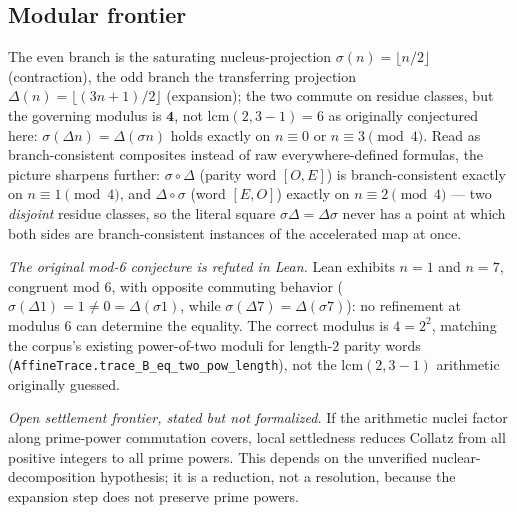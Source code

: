 \subsection{Modular frontier}

\begin{theorem}
  \label{thm:collatz-mod6-commute}
  \leanok
  The even branch is the saturating nucleus-projection $\sigma(n)=\lfloor n/2\rfloor$
  (contraction), the odd branch the transferring projection
  $\Delta(n)=\lfloor(3n+1)/2\rfloor$ (expansion); the two commute on residue classes,
  but the governing modulus is $\mathbf{4}$, not $\mathrm{lcm}(2,3-1)=6$ as originally
  conjectured here: $\sigma(\Delta n)=\Delta(\sigma n)$ holds exactly on
  $n\equiv 0$ or $n\equiv 3\pmod 4$. Read as branch-consistent composites instead of
  raw everywhere-defined formulas, the picture sharpens further: $\sigma\circ\Delta$
  (parity word $[O,E]$) is branch-consistent exactly on $n\equiv1\pmod4$, and
  $\Delta\circ\sigma$ (word $[E,O]$) exactly on $n\equiv2\pmod4$ --- two \emph{disjoint}
  residue classes, so the literal square $\sigma\Delta=\Delta\sigma$ never has a point
  at which both sides are branch-consistent instances of the accelerated map at once.

  \emph{The original mod-6 conjecture is refuted in Lean.} Lean exhibits $n=1$ and
  $n=7$, congruent mod $6$, with opposite commuting behavior
  ($\sigma(\Delta 1)=1\ne0=\Delta(\sigma 1)$, while $\sigma(\Delta 7)=\Delta(\sigma 7)$):
  no refinement at modulus $6$ can determine the equality. The correct modulus is
  $4=2^2$, matching the corpus's existing power-of-two moduli for length-$2$ parity
  words (\texttt{AffineTrace.trace\_B\_eq\_two\_pow\_length}), not the
  $\mathrm{lcm}(2,3-1)$ arithmetic originally guessed.
\end{theorem}

\begin{theorem}
  \label{thm:collatz-prime-power}
  \notready
  \emph{Open settlement frontier, stated but not formalized.} If the arithmetic
  nuclei factor along prime-power commutation covers, local settledness reduces
  Collatz from all positive integers to all prime powers. This depends on the
  unverified nuclear-decomposition hypothesis; it is a reduction, not a
  resolution, because the expansion step does not preserve prime powers.
\end{theorem}
